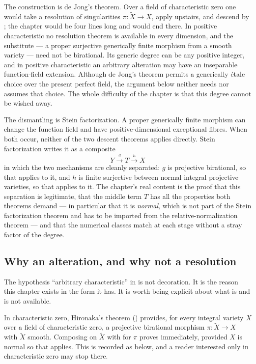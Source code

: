 The construction is de Jong's theorem.  Over a field of characteristic zero
one would take a resolution of singularities $\pi:\widetilde X\to X$,
apply  upstairs, and descend by
; the chapter would be four lines long
and would end there.  In positive characteristic no resolution theorem is
available in every dimension, and the substitute --- a proper surjective
generically finite morphism from a smooth variety --- need not be
birational.
Its generic degree can be any positive integer, and in positive
characteristic an arbitrary alteration may have an inseparable
function-field extension.  Although de Jong's theorem permits a generically
étale choice over the present perfect field, the argument below neither
needs nor assumes that choice.
The whole difficulty of the chapter is that this degree cannot be wished
away.

The dismantling is Stein factorization.  A proper generically finite morphism can change the function field
and have positive-dimensional exceptional fibres.  When both occur,
neither of the two descent theorems applies directly.  Stein factorization writes it as a
composite
\[
 Y\xrightarrow{\ g\ }T\xrightarrow{\ h\ }X
\]
in which the two mechanisms are cleanly separated: $g$ is projective
birational, so that  applies to it, and $h$ is
finite surjective between normal integral projective varieties, so that
 applies to it.  The chapter's real content is
the proof that this separation is legitimate, that the middle term $T$ has
all the properties both theorems demand --- in particular that it is
\emph{normal}, which is not part of the Stein factorization theorem and has
to be imported from the relative-normalization theorem --- and that the
numerical classes match at each stage without a stray factor of the degree.

\subsection{Why an alteration, and why not a resolution}
\label{sec:ch42-why-alteration}

The hypothesis ``arbitrary characteristic'' in
 is not decoration.  It is the reason this
chapter exists in the form it has.  It is worth being explicit about what is
and is not available.

In characteristic zero, Hironaka's theorem
() provides, for every integral variety $X$ over
a field of characteristic zero, a projective birational morphism
$\pi:\widetilde X\to X$ with $\widetilde X$ smooth.  Composing
 on $\widetilde X$ with
 for $\pi$ proves
 immediately, provided $X$ is normal so that
 applies.  This is recorded as
 below, and a reader interested only in
characteristic zero may stop there.

